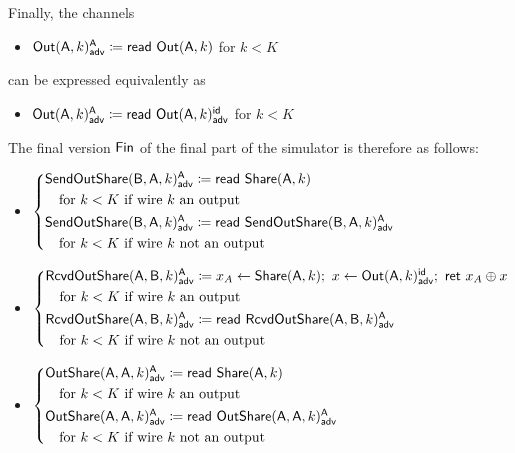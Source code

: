Finally, the channels
\begin{itemize}
\item {\color{blue} $\mathsf{Out}(\mathsf{A},k)^{\mathsf{A}}_{\mathsf{adv}} \coloneqq \mathsf{read} \ \mathsf{Out}(\mathsf{A},k)$ for $k < K$}
\end{itemize}
can be expressed equivalently as
\begin{itemize}
\item {\color{blue} $\mathsf{Out}(\mathsf{A},k)^{\mathsf{A}}_{\mathsf{adv}} \coloneqq \mathsf{read} \ \mathsf{Out}(\mathsf{A},k)^{\mathsf{id}}_{\mathsf{adv}}$ for $k < K$}
\end{itemize}
The final version $\mathsf{Fin}$ of the final part of the simulator is therefore as follows:

\begin{itemize}
\item {\color{blue} $\begin{cases*} \LeakSendOutShare(\B,\A,k)^\A_\adv \coloneqq \read{\Share(\A,k)} \\ \hspace{10pt} \text{for $k < K$ if wire $k$ an output} \\ \LeakSendOutShare(\B,\A,k)^\A_\adv \coloneqq \read{\LeakSendOutShare(\B,\A,k)^\A_\adv} \\ \hspace{10pt} \text{for $k < K$ if wire $k$ not an output} \end{cases*}$}
\item {\color{blue} $\begin{cases*} \LeakRcvdOutShare(\A,\B,k)^\A_\adv \coloneqq x_A \leftarrow \Share(\A,k); \ x \leftarrow \LeakOut(\A,k)^\id_\adv; \ \ret{x_A \oplus x} \\ \hspace{10pt} \text{for $k < K$ if wire $k$ an output} \\ \LeakRcvdOutShare(\A,\B,k)^\A_\adv \coloneqq \read{\LeakRcvdOutShare(\A,\B,k)^\A_\adv} \\ \hspace{10pt} \text{for $k < K$ if wire $k$ not an output} \end{cases*}$}
\item {\color{blue} $\begin{cases*} \LeakOutShare(\A,\A,k)^\A_\adv \coloneqq \read{\Share(\A,k)} \\ \hspace{10pt} \text{for $k < K$ if wire $k$ an output} \\ \LeakOutShare(\A,\A,k)^\A_\adv \coloneqq \read{\LeakOutShare(\A,\A,k)^\A_\adv} \\ \hspace{10pt} \text{for $k < K$ if wire $k$ not an output} \end{cases*}$}

\end{itemize}
